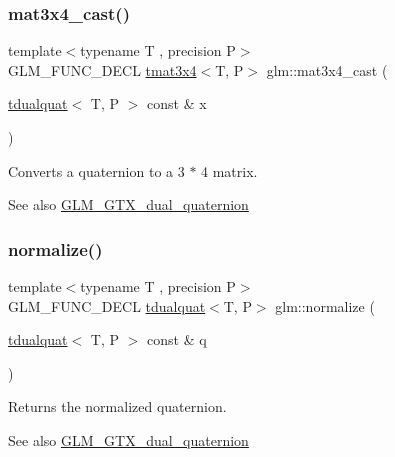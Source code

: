 \subsubsection{\texorpdfstring{mat3x4\+\_\+cast()}{mat3x4\_cast()}}
{\footnotesize\ttfamily template$<$typename T , precision P$>$ \\
G\+L\+M\+\_\+\+F\+U\+N\+C\+\_\+\+D\+E\+CL \hyperlink{structglm_1_1tmat3x4}{tmat3x4}$<$T, P$>$ glm\+::mat3x4\+\_\+cast (\begin{DoxyParamCaption}\item[{\hyperlink{structglm_1_1tdualquat}{tdualquat}$<$ T, P $>$ const \&}]{x }\end{DoxyParamCaption})}

Converts a quaternion to a 3 $\ast$ 4 matrix.

\begin{DoxySeeAlso}{See also}
\hyperlink{group__gtx__dual__quaternion}{G\+L\+M\+\_\+\+G\+T\+X\+\_\+dual\+\_\+quaternion} 
\end{DoxySeeAlso}
\mbox{\label{group__gtx__dual__quaternion_ga495818aa48c23e9e730f87a3c337d1d5}} 
\subsubsection{\texorpdfstring{normalize()}{normalize()}}
{\footnotesize\ttfamily template$<$typename T , precision P$>$ \\
G\+L\+M\+\_\+\+F\+U\+N\+C\+\_\+\+D\+E\+CL \hyperlink{structglm_1_1tdualquat}{tdualquat}$<$T, P$>$ glm\+::normalize (\begin{DoxyParamCaption}\item[{\hyperlink{structglm_1_1tdualquat}{tdualquat}$<$ T, P $>$ const \&}]{q }\end{DoxyParamCaption})}

Returns the normalized quaternion.

\begin{DoxySeeAlso}{See also}
\hyperlink{group__gtx__dual__quaternion}{G\+L\+M\+\_\+\+G\+T\+X\+\_\+dual\+\_\+quaternion} 
\end{DoxySeeAlso}
